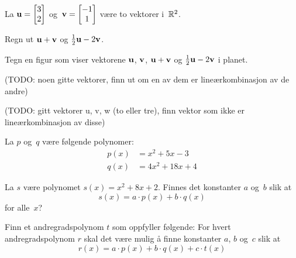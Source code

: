 
\begin{oppgave}
La $\mathbf{u} = \begin{bmatrix} 3 \\ 2 \end{bmatrix}$ og~$\mathbf{v} = \begin{bmatrix} -1 \\ 1 \end{bmatrix}$ være to vektorer
i~$\mathbb{R}^2$.

\begin{punkt}
Regn ut $\mathbf{u} + \mathbf{v}$ og $\frac{1}{2} \mathbf{u} - 2 \mathbf{v}$.
\end{punkt}

\begin{punkt}
Tegn en figur som viser vektorene $\mathbf{u}$, $\mathbf{v}$, $\mathbf{u} + \mathbf{v}$ og
$\frac{1}{2} \mathbf{u} - 2 \mathbf{v}$ i planet.
\end{punkt}
\end{oppgave}


\begin{oppgave}
(TODO: noen gitte vektorer, finn ut om en av dem er lineærkombinasjon av de andre)
\end{oppgave}


\begin{oppgave}
(TODO: gitt vektorer u, v, w (to eller tre), finn vektor som ikke er lineærkombinasjon av disse)
\end{oppgave}


\begin{oppgave}
La $p$ og~$q$ være følgende polynomer:
\begin{align*}
p(x) &= x^2 + 5x - 3 \\
q(x) &= 4x^2 + 18x + 4
\end{align*}
\begin{punkt}
La $s$ være polynomet $s(x) = x^2 + 8x + 2$.  Finnes det konstanter
$a$ og~$b$ slik at
\[
s(x) = a \cdot p(x) + b \cdot q(x)
\]
for alle~$x$?
\end{punkt}
\begin{punkt}
Finn et andregradspolynom $t$ som oppfyller følgende: For hvert
andregradspolynom $r$ skal det være mulig å finne konstanter $a$, $b$
og~$c$ slik at
\[
r(x) = a \cdot p(x) + b \cdot q(x) + c \cdot t(x)
\]
\end{punkt}
\end{oppgave}
